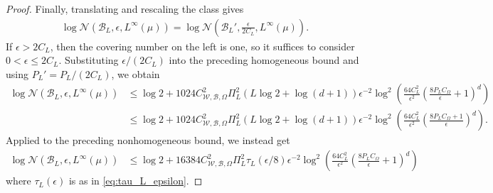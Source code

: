 \documentclass{article}
\def\cB{{\mathcal{B}}}
\def\cN{{\mathcal{N}}}
\def\cW{{\mathcal{W}}}
\begin{document}
\begin{appendices}
\begin{proof}
    Finally, translating and rescaling the class gives
    \begin{align}
        \log \cN(\cB_L, \epsilon, L^\infty(\mu)) = \log \cN\left(\cB_L', \frac{\epsilon}{2 C_L}, L^\infty(\mu)\right).
    \end{align}
    If $\epsilon > 2 C_L$, then the covering number on the left is one, so it suffices to consider $0 < \epsilon \leq 2 C_L$. Substituting $\epsilon/(2 C_L)$ into the preceding homogeneous bound and using $P_L' = P_L/(2 C_L)$, we obtain
    \begin{align}
        \log \cN(\cB_L, \epsilon, L^\infty(\mu)) &\leq \log 2 +  1024 C_{\cW, \cB, \Omega}^2 \Pi_L^2 \left(L \log 2 + \log(d+1) \right) \epsilon^{-2} \log^2 \left( \frac{64 C_L^2}{\epsilon^2} \left( \frac{8 P_L C_{\Omega}}{\epsilon}  + 1\right)^d \right) \\
        &\leq \log 2 +  1024 C_{\cW, \cB, \Omega}^2 \Pi_L^2 \left(L \log 2 + \log(d+1) \right) \epsilon^{-2} \log^2 \left( \frac{64 C_L^2}{\epsilon^2} \left( \frac{8 P_L C_{\Omega} + 1}{\epsilon} \right)^d \right). \label{eq:L_inf_general_bound_homogeneous}
    \end{align}
     Applied to the preceding nonhomogeneous bound, we instead get
    \begin{align}
        \log \cN(\cB_L, \epsilon, L^\infty(\mu)) &\leq \log 2 +  16384 C_{\cW, \cB, \Omega}^2 \Pi_L^2 \tau_L(\epsilon/8) \epsilon^{-2} \log^2 \left( \frac{64 C_L^2}{\epsilon^2} \left( \frac{8 P_L C_{\Omega}}{\epsilon}  + 1\right)^d \right)  \label{eq:L_inf_general_bound_nonhomogeneous}
    \end{align}
    where $\tau_L(\epsilon)$ is as in \eqref{eq:tau_L_epsilon}. 
    

\end{proof}
\end{appendices}
\end{document}

